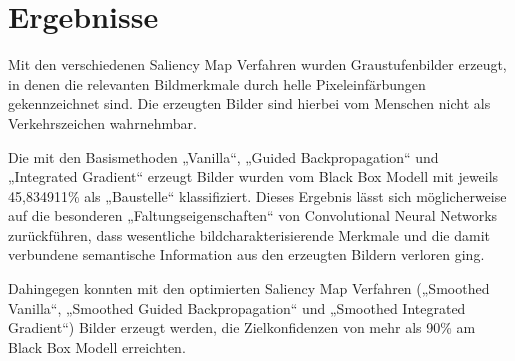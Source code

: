 \section{Ergebnisse}
\label{sec:SalErgebnisse}
Mit den verschiedenen Saliency Map Verfahren wurden Graustufenbilder erzeugt, in denen die relevanten Bildmerkmale durch helle Pixeleinfärbungen gekennzeichnet sind. 
Die erzeugten Bilder sind hierbei vom Menschen nicht als Verkehrszeichen wahrnehmbar.

Die mit den Basismethoden „Vanilla“, „Guided Backpropagation“ und „Integrated Gradient“ erzeugt Bilder wurden vom Black Box Modell mit jeweils 45,834911\% als „Baustelle“ klassifiziert.
Dieses Ergebnis lässt sich möglicherweise auf die besonderen „Faltungseigenschaften“ von Convolutional Neural Networks zurückführen, dass wesentliche bildcharakterisierende Merkmale und die damit verbundene semantische Information aus den erzeugten Bildern verloren ging.

Dahingegen konnten mit den optimierten Saliency Map Verfahren („Smoothed Vanilla“, „Smoothed Guided Backpropagation“ und „Smoothed Integrated Gradient“) Bilder erzeugt werden, die Zielkonfidenzen von mehr als 90\% am Black Box Modell erreichten.

%
%


